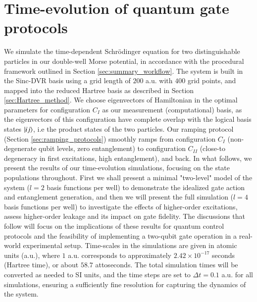 \documentclass{subfiles}
\begin{document}
\section{Time-evolution of quantum gate protocols}\label{sec:time_evolution}
We simulate the time-dependent Schrödinger equation for two distinguishable particles in our double-well Morse potential, in accordance with the procedural framework outlined in Section \ref{sec:summary_workflow}. The system is built in the Sinc-DVR basis using a grid length of $200$ a.u. with $400$ grid points, and mapped into the reduced Hartree basis as described in Section \ref{sec:Hartree_method}. We choose eigenvectors of Hamiltonian in the optimal parameters for configuration $C_I$ as our measurement (computational) basis, as the eigenvectors of this configuration have complete overlap with the logical basis states $\ket{ij}$, i.e the product states of the two particles. Our ramping protocol (Section \ref{sec:ramping_protocols}) smoothly ramps from configuration $C_I$ (non-degenerate qubit levels, zero entanglement) to configuration $C_{II}$ (close-to degeneracy in first excitations, high entanglement), and back. In what follows, we present the results of our time-evolution simulations, focusing on the state populations throughout. First we shall present a minimal "two-level" model of the system ($l=2$ basis functions per well) to demonstrate the idealized gate action and entanglement generation, and then we will present the full simulation ($l=4$ basis functions per well) to investigate the effects of higher-order excitations, assess higher-order leakage and its impact on gate fidelity. The discussions that follow will focus on the implications of these results for quantum control protocols and the feasibility of implementing a two-qubit gate operation in a real-world experimental setup. Time-scales in the simulations are given in atomic units (a.u.), where $1$ a.u. corresponds to approximately $2.42 \times 10^{-17}$ seconds (Hartree time), or about $58.7$ attoseconds. The total simulation times will be converted as needed to SI units, and the time steps are set to $\Delta t = 0.1$ a.u. for all simulations, ensuring a sufficiently fine resolution for capturing the dynamics of the system.
\end{document}
